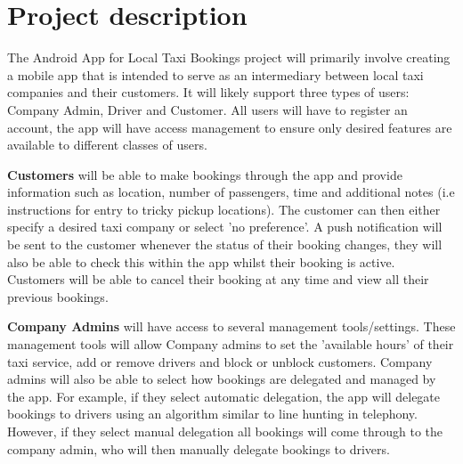 \documentclass[11pt,fleqn,twoside]{article}
\begin{document}
	
\wordcount{}
\mmp

\section{Project description} \label{project_description}
The Android App for Local Taxi Bookings project will primarily involve creating a mobile app that is intended to serve as an intermediary between local taxi companies and their customers. It will likely support three types of users: Company Admin, Driver and Customer. All users will have to register an account, the app will have access management to ensure only desired features are available to different classes of users. \par

\textbf{Customers} will be able to make bookings through the app and provide information such as location, number of passengers, time and additional notes (i.e instructions for entry to tricky pickup locations). The customer can then either specify a desired taxi company or select 'no preference'. A push notification will be sent to the customer whenever the status of their booking changes, they will also be able to check this within the app whilst their booking is active. Customers will be able to cancel their booking at any time and view all their previous bookings. \par

\textbf{Company Admins} will have access to several management tools/settings. These management tools will allow Company admins to set the 'available hours' of their taxi service, add or remove drivers and block or unblock customers. Company admins will also be able to select how bookings are delegated and managed by the app. For example, if they select automatic delegation, the app will delegate bookings to drivers using an algorithm similar to line hunting in telephony. However, if they select manual delegation all bookings will come through to the company admin, who will then manually delegate bookings to drivers. \par
\end{document}

